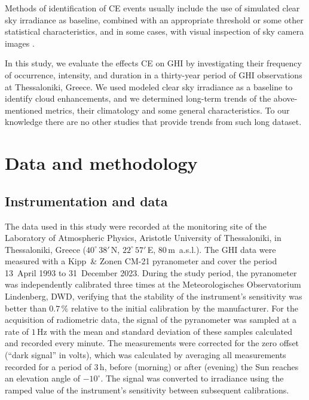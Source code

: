 \documentclass[preprint, 5p,
authoryear]{elsarticle} %
\begin{document}
Methods of identification of CE events usually include the use of
simulated clear sky irradiance as baseline, combined with an appropriate
threshold or some other statistical characteristics, and in some cases,
with visual inspection of sky camera images \citep[ and references
therein]{Vamvakas2020, Mol2023}.

In this study, we evaluate the effects CE on GHI by investigating their
frequency of occurrence, intensity, and duration in a thirty-year period
of GHI observations at Thessaloniki, Greece. We used modeled clear sky
irradiance as a baseline to identify cloud enhancements, and we
determined long-term trends of the above-mentioned metrics, their
climatology and some general characteristics. To our knowledge there are
no other studies that provide trends from such long dataset.

\hypertarget{data-and-methodology}{%
\section{Data and methodology}\label{data-and-methodology}}

\hypertarget{instrumentation-and-data}{%
\subsection{Instrumentation and data}\label{instrumentation-and-data}}

The data used in this study were recorded at the monitoring site of the
Laboratory of Atmospheric Physics, Aristotle University of Thessaloniki,
in Thessaloniki, Greece (\(40^\circ\,38'\,\)N, \(22^\circ\,57'\,\)E,
\(80\,\)m~a.s.l.). The GHI data were measured with a Kipp~\& Zonen CM-21
pyranometer and cover the period 13~April 1993 to 31~December 2023.
During the study period, the pyranometer was independently calibrated
three times at the Meteorologisches Observatorium Lindenberg, DWD,
verifying that the stability of the instrument's sensitivity was better
than \(0.7\,\%\) relative to the initial calibration by the
manufacturer. For the acquisition of radiometric data, the signal of the
pyranometer was sampled at a rate of \(1\,\text{Hz}\) with the mean and
standard deviation of these samples calculated and recorded every
minute. The measurements were corrected for the zero offset (``dark
signal'' in volts), which was calculated by averaging all measurements
recorded for a period of \(3\,\text{h}\), before (morning) or after
(evening) the Sun reaches an elevation angle of \(-10^\circ\). The
signal was converted to irradiance using the ramped value of the
instrument's sensitivity between subsequent calibrations.
\end{document}
